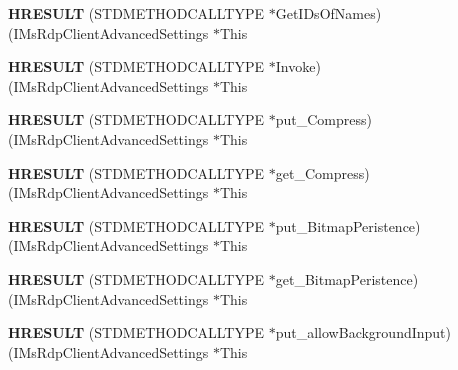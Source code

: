 \begin{DoxyCompactItemize}
\item 
\mbox{\label{struct_i_ms_rdp_client_advanced_settings_vtbl_ac2304694a944a0ff740bb19db15661b4}} 
{\bfseries H\+R\+E\+S\+U\+LT} (S\+T\+D\+M\+E\+T\+H\+O\+D\+C\+A\+L\+L\+T\+Y\+PE $\ast$Get\+I\+Ds\+Of\+Names)(I\+Ms\+Rdp\+Client\+Advanced\+Settings $\ast$This
\item 
\mbox{\label{struct_i_ms_rdp_client_advanced_settings_vtbl_a9cd33542febcc8c2e982b1a45361481e}} 
{\bfseries H\+R\+E\+S\+U\+LT} (S\+T\+D\+M\+E\+T\+H\+O\+D\+C\+A\+L\+L\+T\+Y\+PE $\ast$Invoke)(I\+Ms\+Rdp\+Client\+Advanced\+Settings $\ast$This
\item 
\mbox{\label{struct_i_ms_rdp_client_advanced_settings_vtbl_ad49684c35c2a70def851f9214a58a5de}} 
{\bfseries H\+R\+E\+S\+U\+LT} (S\+T\+D\+M\+E\+T\+H\+O\+D\+C\+A\+L\+L\+T\+Y\+PE $\ast$put\+\_\+\+Compress)(I\+Ms\+Rdp\+Client\+Advanced\+Settings $\ast$This
\item 
\mbox{\label{struct_i_ms_rdp_client_advanced_settings_vtbl_aea831fa0712b3d20cf8ab041144fcdec}} 
{\bfseries H\+R\+E\+S\+U\+LT} (S\+T\+D\+M\+E\+T\+H\+O\+D\+C\+A\+L\+L\+T\+Y\+PE $\ast$get\+\_\+\+Compress)(I\+Ms\+Rdp\+Client\+Advanced\+Settings $\ast$This
\item 
\mbox{\label{struct_i_ms_rdp_client_advanced_settings_vtbl_ae11f24d628bda489f69366c6aef94b8c}} 
{\bfseries H\+R\+E\+S\+U\+LT} (S\+T\+D\+M\+E\+T\+H\+O\+D\+C\+A\+L\+L\+T\+Y\+PE $\ast$put\+\_\+\+Bitmap\+Peristence)(I\+Ms\+Rdp\+Client\+Advanced\+Settings $\ast$This
\item 
\mbox{\label{struct_i_ms_rdp_client_advanced_settings_vtbl_ad00fda58249639cc7ab4d0e8d2b7cabb}} 
{\bfseries H\+R\+E\+S\+U\+LT} (S\+T\+D\+M\+E\+T\+H\+O\+D\+C\+A\+L\+L\+T\+Y\+PE $\ast$get\+\_\+\+Bitmap\+Peristence)(I\+Ms\+Rdp\+Client\+Advanced\+Settings $\ast$This
\item 
\mbox{\label{struct_i_ms_rdp_client_advanced_settings_vtbl_a3127308c56f34f2cbcd1031af30fbc50}} 
{\bfseries H\+R\+E\+S\+U\+LT} (S\+T\+D\+M\+E\+T\+H\+O\+D\+C\+A\+L\+L\+T\+Y\+PE $\ast$put\+\_\+allow\+Background\+Input)(I\+Ms\+Rdp\+Client\+Advanced\+Settings $\ast$This

\end{DoxyCompactItemize}
